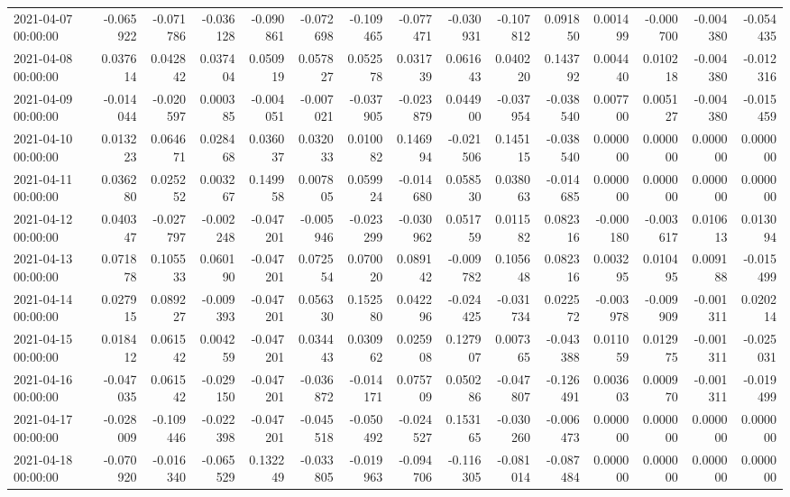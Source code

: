 \begin{tabular}{lrrrrrrrrrrrrrr}
2021-04-07 00:00:00 & -0.065922 & -0.071786 & -0.036128 & -0.090861 & -0.072698 & -0.109465 & -0.077471 & -0.030931 & -0.107812 & 0.091850 & 0.001499 & -0.000700 & -0.004380 & -0.054435 \\
2021-04-08 00:00:00 & 0.037614 & 0.042842 & 0.037404 & 0.050919 & 0.057827 & 0.052578 & 0.031739 & 0.061643 & 0.040220 & 0.143792 & 0.004440 & 0.010218 & -0.004380 & -0.012316 \\
2021-04-09 00:00:00 & -0.014044 & -0.020597 & 0.000385 & -0.004051 & -0.007021 & -0.037905 & -0.023879 & 0.044900 & -0.037954 & -0.038540 & 0.007700 & 0.005127 & -0.004380 & -0.015459 \\
2021-04-10 00:00:00 & 0.013223 & 0.064671 & 0.028468 & 0.036037 & 0.032033 & 0.010082 & 0.146994 & -0.021506 & 0.145115 & -0.038540 & 0.000000 & 0.000000 & 0.000000 & 0.000000 \\
2021-04-11 00:00:00 & 0.036280 & 0.025252 & 0.003267 & 0.149958 & 0.007805 & 0.059924 & -0.014680 & 0.058530 & 0.038063 & -0.014685 & 0.000000 & 0.000000 & 0.000000 & 0.000000 \\
2021-04-12 00:00:00 & 0.040347 & -0.027797 & -0.002248 & -0.047201 & -0.005946 & -0.023299 & -0.030962 & 0.051759 & 0.011582 & 0.082316 & -0.000180 & -0.003617 & 0.010613 & 0.013094 \\
2021-04-13 00:00:00 & 0.071878 & 0.105533 & 0.060190 & -0.047201 & 0.072554 & 0.070020 & 0.089142 & -0.009782 & 0.105648 & 0.082316 & 0.003295 & 0.010495 & 0.009188 & -0.015499 \\
2021-04-14 00:00:00 & 0.027915 & 0.089227 & -0.009393 & -0.047201 & 0.056330 & 0.152580 & 0.042296 & -0.024425 & -0.031734 & 0.022572 & -0.003978 & -0.009909 & -0.001311 & 0.020214 \\
2021-04-15 00:00:00 & 0.018412 & 0.061542 & 0.004259 & -0.047201 & 0.034443 & 0.030962 & 0.025908 & 0.127907 & 0.007365 & -0.043388 & 0.011059 & 0.012975 & -0.001311 & -0.025031 \\
2021-04-16 00:00:00 & -0.047035 & 0.061542 & -0.029150 & -0.047201 & -0.036872 & -0.014171 & 0.075709 & 0.050286 & -0.047807 & -0.126491 & 0.003603 & 0.000970 & -0.001311 & -0.019499 \\
2021-04-17 00:00:00 & -0.028009 & -0.109446 & -0.022398 & -0.047201 & -0.045518 & -0.050492 & -0.024527 & 0.153165 & -0.030260 & -0.006473 & 0.000000 & 0.000000 & 0.000000 & 0.000000 \\
2021-04-18 00:00:00 & -0.070920 & -0.016340 & -0.065529 & 0.132249 & -0.033805 & -0.019963 & -0.094706 & -0.116305 & -0.081014 & -0.087484 & 0.000000 & 0.000000 & 0.000000 & 0.000000 \\

\end{tabular}
